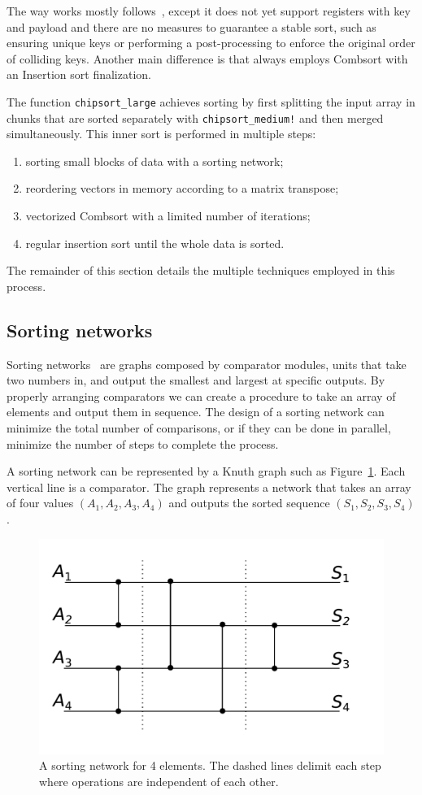 \documentclass{juliacon}
\begin{document}
The way \chipsort works mostly follows~\cite{DBLP:journals/pvldb/InoueT15}, except it does not yet support registers with key and payload and there are no measures to guarantee a stable sort, such as ensuring unique keys or performing a post-processing to enforce the original order of colliding keys. Another main difference is that \chipsort always employs Combsort with an Insertion sort finalization.

The function {\tt chipsort\_large} achieves sorting by first splitting the input array in chunks that are sorted separately with {\tt chipsort\_medium!}  and then merged simultaneously. This inner sort is performed in multiple steps:
\begin{enumerate}
\item sorting small blocks of data with a sorting network;
\item reordering vectors in memory according to a matrix transpose;
\item vectorized Combsort with a limited number of iterations;
\item regular insertion sort until the whole data is sorted.
\end{enumerate}

The remainder of this section details the multiple techniques employed in this process.

\subsection{Sorting networks}
%
Sorting networks~\cite[Sec. 5.3.4]{DBLP:books/lib/Knuth98a} are graphs composed by comparator modules, units that take two numbers in, and output the smallest and largest at specific outputs. By properly arranging comparators we can create a procedure to take an array of elements and output them in sequence. The design of a sorting network can minimize the total number of comparisons, or if they can be done in parallel, minimize the number of steps to complete the process.

A sorting network can be represented by a Knuth graph such as Figure~\ref{fig:sorting-network}. Each vertical line is a comparator. The graph represents a network that takes an array of four values $(A_1, A_2, A_3, A_4)$ and outputs the sorted sequence $(S_1, S_2, S_3, S_4)$.
\begin{figure}[htb]
\centerline{\includegraphics[width=0.6\linewidth]{fig/sorting-network-4.pdf}}
\caption{A sorting network for 4 elements. The dashed lines delimit each step where operations are independent of each other.}
\label{fig:sorting-network}
\end{figure}
\end{document}
